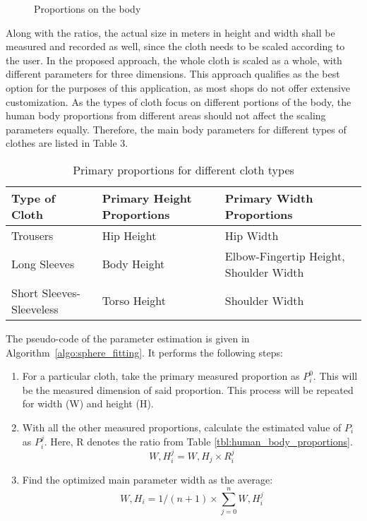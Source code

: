 \begin{figure}[h]
\centerline{}
\caption{Proportions on the body}
\label{fig:body_proportions}
\end{figure}

Along with the ratios, the actual size in meters in height and width shall be measured and recorded as well, since the cloth needs to be scaled according to the user. In the proposed approach, the whole cloth is scaled as a whole, with different parameters for three dimensions. This approach qualifies as the best option for the purposes of this application, as most shops do not offer extensive customization. As the types of cloth focus on different portions of the body, the human body proportions from different areas should not affect the scaling parameters equally. Therefore, the main body parameters for different types of clothes are listed in Table 3.

\begin{table}
\center
\begin{tabular}{ | p{3cm} | p{3.5cm} | p{3.5cm}  |}
\hline
\textbf{Type of Cloth} & \textbf{Primary Height Proportions} & \textbf{Primary Width Proportions}  \\ \hline
Trousers & Hip Height & Hip Width \\ \hline
Long Sleeves & Body Height & Elbow-Fingertip Height, Shoulder Width \\ \hline
Short Sleeves-Sleeveless & Torso Height & Shoulder Width \\ 
\hline
\end{tabular}
\caption{Primary proportions for different cloth types}
\label{tbl:primary_proportions}
\end{table}

The pseudo-code of the parameter estimation is given in Algorithm~\ref{algo:sphere_fitting}. It performs the following steps:

\begin{enumerate}
\item For a particular cloth, take the primary measured proportion as $P_i^0$. This will be the measured dimension of said proportion. 
This process will be repeated for width (W) and height (H).
\item With all the other measured proportions, calculate the estimated value of $P_i$ as $P_i^j$. Here, R denotes the ratio from Table \ref{tbl:human_body_proportions}.
\begin{equation}
W,H_i^j=W,H_j \times R_i^j
\label{eqn:proportion_estimation}
\end{equation}
\item Find the optimized main parameter width as the average:
\begin{equation}
W,H_i=1/(n+1) \times \sum\limits_{j=0}^n W,H_i^j
\label{eqn:optimized_parameter}
\end{equation}
\end{enumerate}

